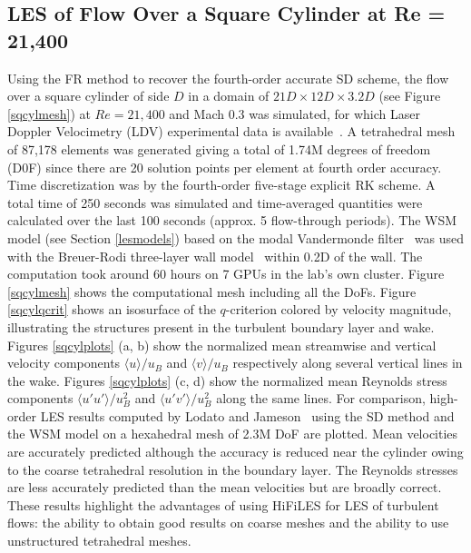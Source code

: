 \graphicspath{{figures_squarecylinder/}}%

\subsection{LES of Flow Over a Square Cylinder at Re = 21,400}\label{sqcyl}

Using the FR method to recover the fourth-order accurate SD scheme, the flow over a square cylinder of side $D$ in a domain of $21D \times 12D \times 3.2D$ (see Figure \ref{sqcylmesh}) at $Re = 21,400$ and Mach 0.3 was simulated, for which Laser Doppler Velocimetry (LDV) experimental data is available~\cite{lyn1994,lyn1995}.
A tetrahedral mesh of 87,178 elements was generated giving a total of 1.74M degrees of freedom (D0F) since there are 20 solution points per element at fourth order accuracy.
Time discretization was by the fourth-order five-stage explicit RK scheme.
A total time of 250 seconds was simulated and time-averaged quantities were calculated over the last 100 seconds (approx. 5 flow-through periods).
The WSM model (see Section \ref{lesmodels}) based on the modal Vandermonde filter~\cite{bull2014a} was used with the Breuer-Rodi three-layer wall model~\cite{breuer1994} within 0.2D of the wall.
The computation took around 60 hours on 7 GPUs in the lab's own cluster.
Figure \ref{sqcylmesh} shows the computational mesh including all the DoFs.
Figure \ref{sqcylqcrit} shows an isosurface of the $q$-criterion colored by velocity magnitude, illustrating the structures present in the turbulent boundary layer and wake.
Figures \ref{sqcylplots} (a, b) show the normalized mean streamwise and vertical velocity components $\langle u \rangle/u_B$ and $\langle v \rangle/u_B$ respectively along several vertical lines in the wake.
Figures \ref{sqcylplots} (c, d) show the normalized mean Reynolds stress components $\langle u'u' \rangle/u_B^2$ and $\langle u'v' \rangle/u_B^2$ along the same lines.
For comparison, high-order LES results computed by Lodato and Jameson~\cite{lodato2012b} using the SD method and the WSM model on a hexahedral mesh of 2.3M DoF are plotted.
Mean velocities are accurately predicted although the accuracy is reduced near the cylinder owing to the coarse tetrahedral resolution in the boundary layer.
The Reynolds stresses are less accurately predicted than the mean velocities but are broadly correct.
These results highlight the advantages of using HiFiLES for LES of turbulent flows: the ability to obtain good results on coarse meshes and the ability to use unstructured tetrahedral meshes.


